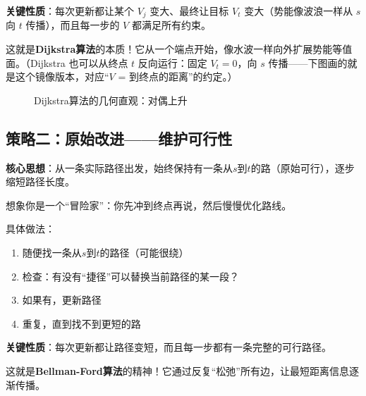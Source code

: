 \textbf{关键性质}：每次更新都让某个 $V_j$ 变大、最终让目标 $V_t$ 变大（势能像波浪一样从 $s$ 向 $t$ 传播），而且每一步的 $V$ 都满足所有约束。

这就是\textbf{Dijkstra算法}的本质！它从一个端点开始，像水波一样向外扩展势能等值面。（Dijkstra 也可以从终点 $t$ 反向运行：固定 $V_t = 0$，向 $s$ 传播——下图画的就是这个镜像版本，对应“$V$ = 到终点的距离”的约定。）

\begin{figure}[htbp]
\centering
{}
\caption{Dijkstra算法的几何直观：对偶上升}
\end{figure}

\subsection{策略二：原始改进——维护可行性}

\textbf{核心思想}：从一条实际路径出发，始终保持有一条从$s$到$t$的路（原始可行），逐步缩短路径长度。

想象你是一个“冒险家”：你先冲到终点再说，然后慢慢优化路线。

具体做法：
\begin{enumerate}
    \item 随便找一条从$s$到$t$的路径（可能很绕）
    \item 检查：有没有“捷径”可以替换当前路径的某一段？
    \item 如果有，更新路径
    \item 重复，直到找不到更短的路
\end{enumerate}

\textbf{关键性质}：每次更新都让路径变短，而且每一步都有一条完整的可行路径。

这就是\textbf{Bellman-Ford算法}的精神！它通过反复“松弛”所有边，让最短距离信息逐渐传播。

